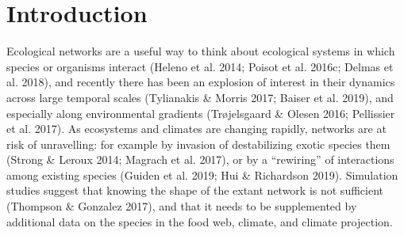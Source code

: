 \newcommand{\plusnamesingular}{}
\newcommand{\starnamesingular}{}
\newcommand{\xrefname}[1]{\protect\renewcommand{\plusnamesingular}{#1}}
\newcommand{\Xrefname}[1]{\protect\renewcommand{\starnamesingular}{#1}}
\providecommand{\cref}{\plusnamesingular~\ref}
\providecommand{\Cref}{\starnamesingular~\ref}
\providecommand{\crefformat}[2]{}
\providecommand{\Crefformat}[2]{}

\crefformat{figure}{fig.~#2#1#3}
\Crefformat{figure}{Figure~#2#1#3}

\hypertarget{introduction}{%
\section{Introduction}\label{introduction}}

Ecological networks are a useful way to think about ecological systems
in which species or organisms interact (Heleno et al. 2014; Poisot et
al. 2016c; Delmas et al. 2018), and recently there has been an explosion
of interest in their dynamics across large temporal scales (Tylianakis
\& Morris 2017; Baiser et al. 2019), and especially along environmental
gradients (Trøjelsgaard \& Olesen 2016; Pellissier et al. 2017). As
ecosystems and climates are changing rapidly, networks are at risk of
unravelling: for example by invasion of destabilizing exotic species
them (Strong \& Leroux 2014; Magrach et al. 2017), or by a ``rewiring''
of interactions among existing species (Guiden et al. 2019; Hui \&
Richardson 2019). Simulation studies suggest that knowing the shape of
the extant network is not sufficient (Thompson \& Gonzalez 2017), and
that it needs to be supplemented by additional data on the species in
the food web, climate, and climate projection.

